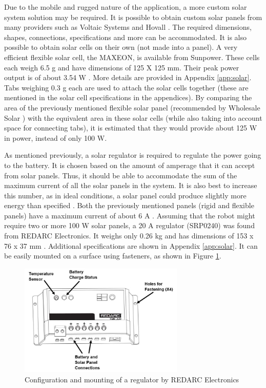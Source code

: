 Due to the mobile and rugged nature of the application, a more custom solar system solution may be required. It is possible to obtain custom solar panels from many providers such as Voltaic Systems \cite{voltaic_systems_custom_nodate} and Hovall \cite{hovall_custom_nodate}. The required dimensions, shapes, connections, specifications and more can be accommodated. It is also possible to obtain solar cells on their own (not made into a panel). A very efficient flexible solar cell, the MAXEON, is available from Sunpower. These cells each weigh 6.5 g and have dimensions of 125 X 125 mm. Their peak power output is of about 3.54 W \cite{sunpower_buy_2017}. More details are provided in Appendix \ref{app:solar}. Tabs weighing 0.3 g each are used to attach the solar cells together (these are mentioned in the solar cell specifications in the appendices). By comparing the area of the previously mentioned flexible solar panel (recommended by Wholesale Solar \cite{wholesale_solar_sunpower_nodate}) with the equivalent area in these solar cells (while also taking into account space for connecting tabs), it is estimated that they would provide about 125 W in power, instead of only 100 W.

As mentioned previously, a solar regulator is required to regulate the power going to the battery.
It is chosen based on the amount of amperage that it can accept from solar panels. Thus, it should be able to accommodate the sum of the maximum current of all the solar panels in the system. It is also best to increase this number, as in ideal conditions, a solar panel could produce slightly more energy than specified \cite{smith_caravansplus:_nodate}. Both the previously mentioned panels (rigid and flexible panels) have a maximum current of about 6 A \cite{wholesale_solar_sunpower_nodate} \cite{wholesale_solar_solarland_nodate}. Assuming that the robot might require two or more 100 W solar panels, a 20 A regulator (SRP0240) was found from REDARC Electronics. It weighs only 0.26 kg and has dimensions of 153 x 76 x 37 mm \cite{redarc_electronics_20a_nodate}. Additional specifications are shown in Appendix \ref{app:solar}. It can be easily mounted on a surface using fasteners, as shown in Figure \ref{fig:solar_reg}.

\begin{figure}[H]
    \centering
    \includegraphics[width=0.7\textwidth]{Sections/LiteratureReview/img/solar/solar_reg.JPG}
    \caption{Configuration and mounting of a regulator by REDARC Electronics \cite{redarc_electronics_20a_nodate}}
    \label{fig:solar_reg}
\end{figure}

